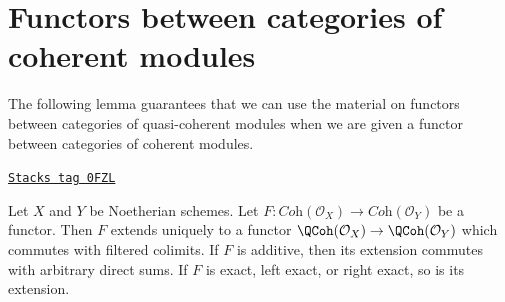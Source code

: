 \section{Functors between categories of coherent modules}
\label{functors-section-functor-coherent}
The following lemma guarantees that we can use the material on
functors between categories of quasi-coherent modules when
we are given a functor between categories of coherent modules.

\begin{lemma}
\label{functors-lemma-functor-coherent}
\href{https://stacks.math.columbia.edu/tag/0FZL}{\texttt{Stacks tag 0FZL}}

Let $X$ and $Y$ be Noetherian schemes. Let
$F : \textit{Coh}(\mathcal{O}_X) \to \textit{Coh}(\mathcal{O}_Y)$
be a functor. Then $F$ extends uniquely to a functor
$\QCoh(\mathcal{O}_X) \to \QCoh(\mathcal{O}_Y)$
which commutes with filtered colimits.
If $F$ is additive, then its extension commutes with arbitrary direct sums.
If $F$ is exact, left exact, or right exact, so is its extension.
\end{lemma}

